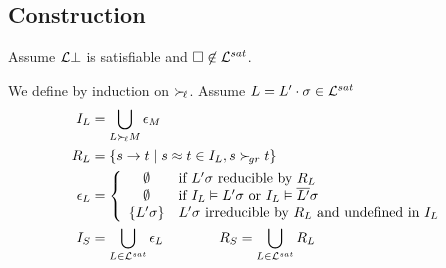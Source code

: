 \documentclass[%
]{beamer}
\begin{document}
\subsection{Construction}
\begin{frame}
    Assume $\mathcal{L}\bot$ is satisfiable and
    $\square\not\in\mathcal{L}^{sat}$.

    We define by induction on $\mathrel\succ_{\!\ell}$.
    Assume $L = L'\cdot\sigma \in\mathcal{L}^{sat}$
    \begin{align*}
        I_L &= \bigcup_{L\mathrel\succ_{\!\ell} M}\epsilon_M
        \\
        R_L &= \{ s \to t \mid s\approx t\in I_L, s\mathrel\succ_{\!gr} t \}
        \\
        \epsilon_L &= \left\{
            \begin{array}{cl}
                \emptyset &\text{if }
                L'\sigma\text{ reducible by }R_L
                \\
                \emptyset &\text{if }
                I_L\vDash L'\sigma
                \text{ or }
                I_L\vDash \overline{L'}\sigma
                \\
                \{ L'\sigma \}
                &L'\sigma\text{ irreducible by }R_L\text{ and undefined in }I_L
            \end{array}
        \right.\\
        I_S &= \bigcup_{L\in\mathcal{L}^{sat}} \epsilon_L
        \qquad\qquad
        R_S = \bigcup_{L\in\mathcal{L}^{sat}} R_L
    \end{align*}
\end{frame}
\end{document}
